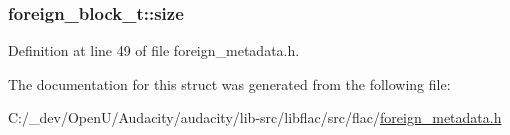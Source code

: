 \subsubsection[{\texorpdfstring{size}{size}}]{ foreign\+\_\+block\+\_\+t\+::size}\hypertarget{structforeign__block__t_a6aba5c004554c4f1a0a273ac202f071d}{}\label{structforeign__block__t_a6aba5c004554c4f1a0a273ac202f071d}


Definition at line 49 of file foreign\+\_\+metadata.\+h.



The documentation for this struct was generated from the following file\+:\begin{DoxyCompactItemize}
\item 
C\+:/\+\_\+dev/\+Open\+U/\+Audacity/audacity/lib-\/src/libflac/src/flac/\hyperlink{foreign__metadata_8h}{foreign\+\_\+metadata.\+h}\end{DoxyCompactItemize}
